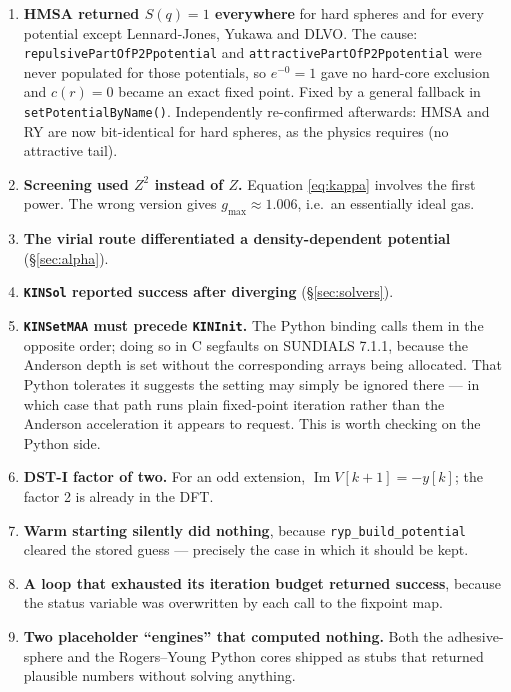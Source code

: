 \documentclass[11pt,a4paper]{article}
\newcommand{\code}[1]{\texttt{\hspace{0pt}#1}}
\begin{document}
\begin{enumerate}
\item \textbf{HMSA returned $S(q)=1$ everywhere} for hard spheres and for
every potential except Lennard-Jones, Yukawa and DLVO. The cause:
\code{repulsivePartOfP2Ppotential} and
\code{attractivePartOfP2Ppotential} were never populated for those
potentials, so $e^{-0}=1$ gave no hard-core exclusion and $c(r)=0$ became an
exact fixed point. Fixed by a general fallback in
\code{setPotentialByName()}. Independently re-confirmed afterwards: HMSA and
RY are now bit-identical for hard spheres, as the physics requires (no
attractive tail).

\item \textbf{Screening used $Z^2$ instead of $Z$.} Equation
\eqref{eq:kappa} involves the first power. The wrong version gives
$g_{\max}\approx1.006$, i.e.\ an essentially ideal gas.

\item \textbf{The virial route differentiated a density-dependent
potential} (\S\ref{sec:alpha}).

\item \textbf{\code{KINSol} reported success after diverging}
(\S\ref{sec:solvers}).

\item \textbf{\code{KINSetMAA} must precede \code{KINInit}.} The Python
binding calls them in the opposite order; doing so in C segfaults on SUNDIALS
7.1.1, because the Anderson depth is set without the corresponding arrays
being allocated. That Python tolerates it suggests the setting may simply be
ignored there --- in which case that path runs plain fixed-point iteration
rather than the Anderson acceleration it appears to request. This is worth
checking on the Python side.

\item \textbf{DST-I factor of two.} For an odd extension,
$\operatorname{Im}V[k+1]=-y[k]$; the factor 2 is already in the DFT.

\item \textbf{Warm starting silently did nothing}, because
\code{ryp\_build\_potential} cleared the stored guess --- precisely the case
in which it should be kept.

\item \textbf{A loop that exhausted its iteration budget returned success},
because the status variable was overwritten by each call to the fixpoint map.


\item \textbf{Two placeholder ``engines'' that computed nothing.} Both the
adhesive-sphere and the Rogers--Young Python cores shipped as stubs that
returned plausible numbers without solving anything.


\end{enumerate}
\end{document}
